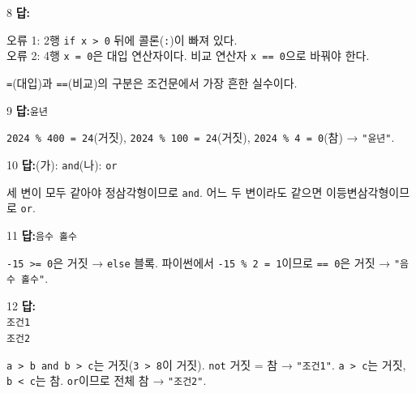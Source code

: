 \documentclass[a4paper, 11pt]{article}
\begin{document}
\begin{answerbox}{8}
\textbf{답:}

오류 1: 2행 \texttt{if x > 0} 뒤에 콜론(\texttt{:})이 빠져 있다.\\
오류 2: 4행 \texttt{x = 0}은 대입 연산자이다. 비교 연산자 \texttt{x == 0}으로 바꿔야 한다.

\begin{explainbox}
\texttt{=}(대입)과 \texttt{==}(비교)의 구분은 조건문에서 가장 흔한 실수이다.
\end{explainbox}
\end{answerbox}

\begin{answerbox}{9}
\textbf{답:}\quad \texttt{윤년}

\begin{explainbox}
\texttt{2024 \% 400 = 24}(거짓), \texttt{2024 \% 100 = 24}(거짓), \texttt{2024 \% 4 = 0}(참) → \texttt{"윤년"}.
\end{explainbox}
\end{answerbox}

\begin{answerbox}{10}
\textbf{답:}\quad (가): \texttt{and}\qquad (나): \texttt{or}

\begin{explainbox}
세 변이 모두 같아야 정삼각형이므로 \texttt{and}. 어느 두 변이라도 같으면 이등변삼각형이므로 \texttt{or}.
\end{explainbox}
\end{answerbox}

\begin{answerbox}{11}
\textbf{답:}\quad \texttt{음수 홀수}

\begin{explainbox}
\texttt{-15 >= 0}은 거짓 → \texttt{else} 블록. 파이썬에서 \texttt{-15 \% 2 = 1}이므로 \texttt{== 0}은 거짓 → \texttt{"음수 홀수"}.
\end{explainbox}
\end{answerbox}

\begin{answerbox}{12}
\textbf{답:}\\
\texttt{조건1}\\
\texttt{조건2}

\begin{explainbox}
\texttt{a > b and b > c}는 거짓(\texttt{3 > 8}이 거짓). \texttt{not} 거짓 = 참 → \texttt{"조건1"}. \texttt{a > c}는 거짓, \texttt{b < c}는 참. \texttt{or}이므로 전체 참 → \texttt{"조건2"}.
\end{explainbox}
\end{answerbox}
\end{document}
